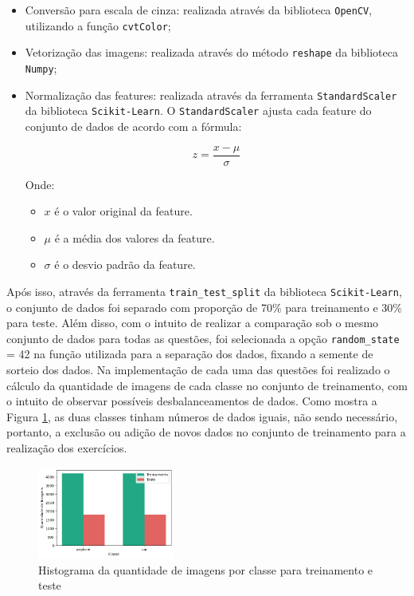 \documentclass[]{abntex2}
\begin{document}
\begin{itemize}
    \item Conversão para escala de cinza: realizada através da biblioteca \texttt{OpenCV}, utilizando a função \texttt{cvtColor};
    \item Vetorização das imagens: realizada através do método \texttt{reshape} da biblioteca \texttt{Numpy};
    \item Normalização das features: realizada através da ferramenta \texttt{StandardScaler} da biblioteca \texttt{Scikit-Learn}. O \texttt{StandardScaler} ajusta cada feature do conjunto de dados de acordo com a fórmula:
    
    \[
    z = \frac{x - \mu}{\sigma}
    \]
    
    Onde:
    \begin{itemize}
        \item \( x \) é o valor original da feature.
        \item \( \mu \) é a média dos valores da feature.
        \item \( \sigma \) é o desvio padrão da feature.
    \end{itemize}
    
\end{itemize}

Após isso, através da ferramenta \texttt{train\_test\_split} da biblioteca \texttt{Scikit-Learn}, o conjunto de dados foi separado com proporção de 70\% para treinamento e 30\% para teste. Além disso, com o intuito de realizar a comparação sob o mesmo conjunto de dados para todas as questões, foi selecionada a opção \texttt{random\_state} = 42 na função utilizada para a separação dos dados, fixando a semente de sorteio dos dados. Na implementação de cada uma das questões foi realizado o cálculo da quantidade de imagens de cada classe no conjunto de treinamento, com o intuito de observar possíveis desbalanceamentos de dados. Como mostra a Figura \ref{fig:distri}, as duas classes tinham números de dados iguais, não sendo necessário, portanto, a exclusão ou adição de novos dados no conjunto de treinamento para a realização dos exercícios.

\begin{figure}[H]
    \centering 
    \includegraphics[width=0.4\textwidth]{imgs/introduction/distri.png}
    \caption{Histograma da quantidade de imagens por classe para treinamento e teste}
    \label{fig:distri} %
\end{figure}
\end{document}
